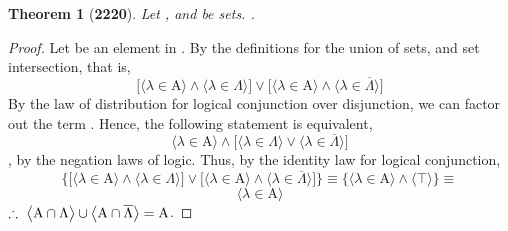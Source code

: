 \documentclass[preview]{standalone}
\newtheorem{theorem}{Theorem}
\begin{document}
\begin{theorem}[\textbf{2220}]
    Let , and \bm{$\Lambda$} be sets. 
    .
\end{theorem}
\begin{proof}
    Let \bm{$\lambda$} be an element in 
    .
    By the definitions for the union of sets, and set intersection, that is,
    \begin{equation*}
        \bigg[
            \Big \langle \lambda \in \mathrm{A} \Big \rangle
                \land
            \Big \langle \lambda \in \Lambda \Big \rangle
        \bigg]
            \lor
        \bigg[
            \Big \langle \lambda \in \mathrm{A} \Big \rangle
                \land
            \Big \langle \lambda \in \overline{\Lambda} \Big \rangle
        \bigg]
    \end{equation*} 
    By the law of distribution for logical conjunction over disjunction,
    we can factor out the term . 
    Hence, the following statement is equivalent,
    \begin{equation*}
        \Big \langle \lambda \in \mathrm{A} \Big \rangle
            \land
        \bigg[
            \Big \langle \lambda \in \Lambda \Big \rangle
                \lor
            \Big \langle \lambda \in \overline{\Lambda} \Big \rangle
        \bigg]
    \end{equation*}
    \bm{$
    \lambda \in \Lambda 
        \lor 
    \lambda \in \overline{\Lambda} 
        \equiv 
    \top
    $},
    by the negation laws of logic.
    Thus, by the identity law for logical conjunction,
    \begin{equation*}
        \Bigg\{
            \bigg[
                \Big \langle \lambda \in \mathrm{A} \Big \rangle
                    \land
                \Big \langle \lambda \in \Lambda \Big \rangle
            \bigg]
                \lor
            \bigg[
                \Big \langle \lambda \in \mathrm{A} \Big \rangle
                    \land
                \Big \langle \lambda \in \overline{\Lambda} \Big \rangle
            \bigg]
        \Bigg\}
            \equiv
        \Bigg\{
            \Big \langle \lambda \in \mathrm{A} \Big \rangle
                \land
            \Big \langle \top \Big \rangle
        \Bigg\}
            \equiv
    \end{equation*}
    \begin{equation*}
        \Big \langle \lambda \in \mathrm{A} \Big \rangle
    \end{equation*}
    $
    \therefore \text{\space} \relax{
    \big \langle \mathrm{A} \cap \Lambda \big \rangle 
        \cup 
    \big \langle \mathrm{A} \cap \overline{\Lambda} \big \rangle
        = 
    \mathrm{A}
    }$.
\end{proof}
\end{document}
